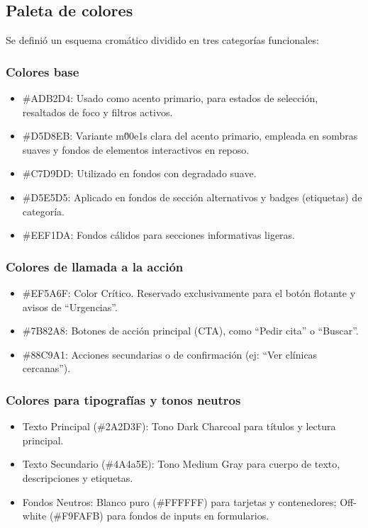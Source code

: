 \documentclass[11pt]{article}
\begin{document}
\subsection{Paleta de colores}

Se definió un esquema cromático dividido en tres categorías funcionales:

\subsubsection{Colores base}

\begin{itemize}
\item \#ADB2D4: Usado como acento primario, para estados de selección, resaltados de foco y filtros activos.
\item \#D5D8EB: Variante m\u00e1s clara del acento primario, empleada en sombras suaves y fondos de elementos interactivos en reposo.
\item \#C7D9DD: Utilizado en fondos con degradado suave.
\item \#D5E5D5: Aplicado en fondos de sección alternativos y badges (etiquetas) de categoría.
\item \#EEF1DA: Fondos cálidos para secciones informativas ligeras.
\end{itemize}

\subsubsection{Colores de llamada a la acción}

\begin{itemize}
\item \#EF5A6F: Color Crítico. Reservado exclusivamente para el botón flotante y avisos de “Urgencias”.
\item \#7B82A8: Botones de acción principal (CTA), como “Pedir cita” o “Buscar”.
\item \#88C9A1: Acciones secundarias o de confirmación (ej: “Ver clínicas cercanas”).
\end{itemize}

\subsubsection{Colores para tipografías y tonos neutros}

\begin{itemize}
\item Texto Principal (\#2A2D3F): Tono Dark Charcoal para títulos y lectura principal.
\item Texto Secundario (\#4A4a5E): Tono Medium Gray para cuerpo de texto, descripciones y etiquetas.
\item Fondos Neutros: Blanco puro (\#FFFFFF) para tarjetas y contenedores; Off-white (\#F9FAFB) para fondos de inputs en formularios.
\end{itemize}
\end{document}
